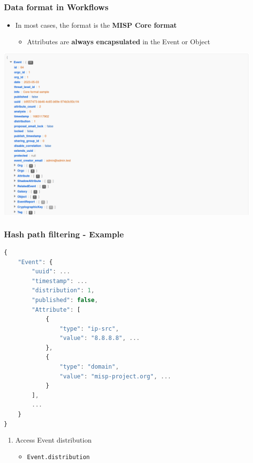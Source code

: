 \begin{frame}
    \frametitle{Data format in Workflows}
    \begin{itemize}
        \item In most cases, the format is the \textbf{MISP Core format}
        \begin{itemize}
            \item Attributes are \textbf{always encapsulated} in the Event or Object
        \end{itemize}
    \end{itemize}
    \begin{center}
        \includegraphics[width=0.9\linewidth]{pictures/misp-core-format.png}
    \end{center}
\end{frame}

\begin{frame}[fragile]
    \frametitle{Hash path filtering - Example}

\begin{lstlisting}[language=javascript,firstnumber=1]
{
    "Event": {
        "uuid": ...
        "timestamp": ...
        "distribution": 1,
        "published": false,
        "Attribute": [
            {
                "type": "ip-src",
                "value": "8.8.8.8", ...
            },
            {
                "type": "domain",
                "value": "misp-project.org", ...
            }
        ],
        ...
    }
}
\end{lstlisting}
    \begin{enumerate}
        \item Access Event distribution
        \begin{itemize}
            \item \texttt{Event.distribution}
        \end{itemize}
    \end{enumerate}
\end{frame}

